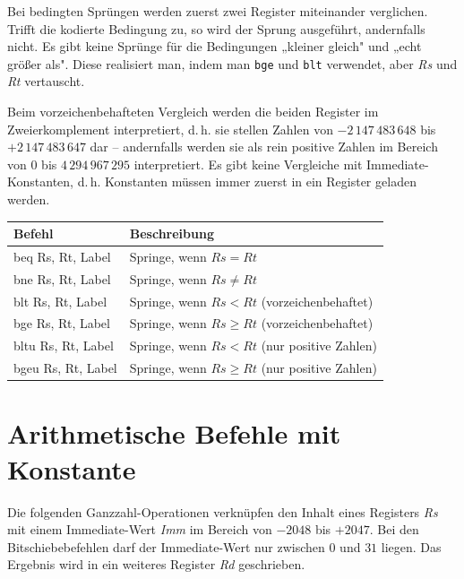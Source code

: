 \documentclass[a4paper,11pt]{article}
\begin{document}
	Bei bedingten Sprüngen werden zuerst zwei Register miteinander verglichen.
	Trifft die kodierte	Bedingung zu, so wird der Sprung ausgeführt, andernfalls nicht.
	Es gibt keine Sprünge für die Bedingungen „kleiner gleich" und „echt größer als".
	Diese realisiert man, indem man	\texttt{bge} und \texttt{blt} verwendet, aber \textit{Rs} und \textit{Rt} vertauscht.
	
	Beim vorzeichenbehafteten Vergleich werden die beiden Register im Zweierkomplement interpretiert, d.\,h. sie stellen Zahlen von $-2\,147\,483\,648$ bis $+2\,147\,483\,647$ dar -- andernfalls werden sie als rein positive Zahlen im Bereich von $0$ bis $4\,294\,967\,295$ interpretiert.
	Es gibt keine Vergleiche mit Immediate-Konstanten, d.\,h. Konstanten müssen immer zuerst in ein	Register geladen werden.
	
	\begin{center}
		\begin{tabular}{>{\ttfamily}lp{7.5cm}}
			\toprule
			\normalfont\textbf{Befehl} & \textbf{Beschreibung} \\
			\midrule
			beq  Rs, Rt, Label & Springe, wenn $Rs = Rt$ \\
			bne  Rs, Rt, Label & Springe, wenn $Rs \neq Rt$ \\
			blt  Rs, Rt, Label & Springe, wenn $Rs < Rt$ (vorzeichenbehaftet) \\
			bge  Rs, Rt, Label & Springe, wenn $Rs \geq Rt$ (vorzeichenbehaftet) \\
			bltu Rs, Rt, Label & Springe, wenn $Rs < Rt$ (nur positive Zahlen) \\
			bgeu Rs, Rt, Label & Springe, wenn $Rs \geq Rt$ (nur positive Zahlen) \\
			\bottomrule
		\end{tabular}
	\end{center}
	
	\newpage
	
	\section{Arithmetische Befehle mit Konstante}
	
	Die folgenden Ganzzahl-Operationen verknüpfen den Inhalt eines Registers \textit{Rs} mit einem Im\-mediate-Wert \textit{Imm} im Bereich von $-2048$ bis $+2047$.
	Bei den Bitschiebebefehlen darf der Im\-medi\-ate-Wert nur zwischen $0$ und $31$ liegen.
	Das Ergebnis wird in ein weiteres Register \textit{Rd} geschrieben.
	
\end{document}
